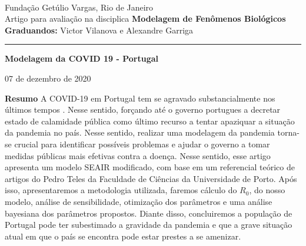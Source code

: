 \documentclass[12pt]{article}
\begin{document}
\hfill \\
Fundação Getúlio Vargas, Rio de Janeiro \\
Artigo para avaliação na disciplica \textbf{Modelagem de Fenômenos Biológicos} \\
\textbf{Graduandos:} Victor Vilanova e Alexandre Garriga \hfill

\smallskip\hrule\bigskip

\begin{center} \textbf{\LARGE Modelagem da COVID 19 - Portugal} \end{center}
\begin{center} 07 de dezembro de 2020 \end{center}
{\Large \textbf{Resumo}}
\newline
A COVID-19 em Portugal tem se agravado substancialmente nos últimos tempos \cite{calamidade}. Nesse sentido, forçando até o governo portugues a decretar estado de calamidade pública como último recurso a tentar apaziquar a situação da pandemia no país. Nesse sentido, realizar uma modelagem da pandemia torna-se crucial para identificar possíveis problemas e ajudar o governo a tomar medidas públicas mais efetivas contra a doença.
\newline
Nesse sentido, esse artigo apresenta um modelo SEAIR modificado, com base em um referencial teórico de artigos do Pedro Teles da Faculdade de Ciências da Universidade de Porto. Após isso, apresentaremos a metodologia utilizada, faremos cálculo do $R_0$, do nosso modelo, análise de sensibilidade, otimização dos parâmetros e uma análise bayesiana dos parâmetros propostos.
\newline
Diante disso, concluiremos a população de Portugal pode ter subestimado a gravidade da pandemia e que a grave situação atual em que o país se encontra pode estar prestes a se amenizar.

\tableofcontents
\thispagestyle{empty}
\end{document}

